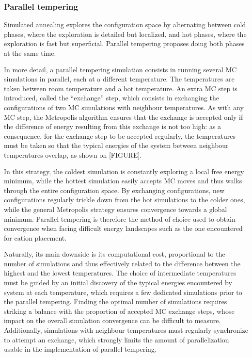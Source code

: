 \documentclass[main.tex]{subfiles}
\begin{document}

\subsubsection{Parallel tempering}

Simulated annealing explores the configuration space by alternating between cold phases, where the exploration is detailed but localized, and hot phases, where the exploration is fast but superficial. Parallel tempering proposes doing both phases at the same time.

In more detail, a parallel tempering simulation consists in running several MC simulations in parallel, each at a different temperature. The temperatures are taken between room temperature and a hot temperature. An extra MC step is introduced, called the ``exchange'' step, which consists in exchanging the configurations of two MC simulations with neighbour temperatures. As with any MC step, the Metropolis algorithm ensures that the exchange is accepted only if the difference of energy resulting from this exchange is not too high: as a consequence, for the exchange step to be accepted regularly, the temperatures must be taken so that the typical energies of the system between neighbour temperatures overlap, as shown on [FIGURE].

In this strategy, the coldest simulation is constantly exploring a local free energy minimum, while the hottest simulation easily accepts MC moves and thus walks through the entire configuration space. By exchanging configurations, new configurations regularly trickle down from the hot simulations to the colder ones, while the general Metropolis strategy ensures convergence towards a global minimum. Parallel tempering is therefore the method of choice used to obtain convergence when facing difficult energy landscapes such as the one encountered for cation placement.

Naturally, its main downside is its computational cost, proportional to the number of simulations and thus effectively related to the difference between the highest and the lowest temperatures. The choice of intermediate temperatures must be guided by an initial discovery of the typical energies encountered by system at each temperature, which requires a few dedicated simulations prior to the parallel tempering. Finding the optimal number of simulations requires striking a balance with the proportion of accepted MC exchange steps, whose impact on the overall simulation convergence can be difficult to measure. Additionally, simulations with neighbour temperatures must regularly synchronize to attempt an exchange, which strongly limits the amount of parallelization usable in the implementation of parallel tempering.
\end{document}

